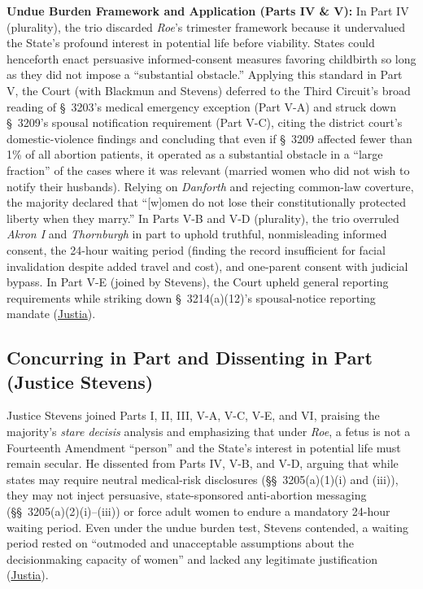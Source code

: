 \documentclass[12pt]{article}
\begin{document}
\textbf{Undue Burden Framework and Application (Parts IV \& V):} In Part IV (plurality), the trio discarded \textit{Roe}'s trimester framework because it undervalued the State's profound interest in potential life before viability. States could henceforth enact persuasive informed-consent measures favoring childbirth so long as they did not impose a ``substantial obstacle.'' Applying this standard in Part V, the Court (with Blackmun and Stevens) deferred to the Third Circuit's broad reading of \S\ 3203's medical emergency exception (Part V-A) and struck down \S\ 3209's spousal notification requirement (Part V-C), citing the district court's domestic-violence findings and concluding that even if \S\ 3209 affected fewer than 1\% of all abortion patients, it operated as a substantial obstacle in a ``large fraction'' of the cases where it was relevant (married women who did not wish to notify their husbands). Relying on \textit{Danforth} and rejecting common-law coverture, the majority declared that ``[w]omen do not lose their constitutionally protected liberty when they marry.'' In Parts V-B and V-D (plurality), the trio overruled \textit{Akron I} and \textit{Thornburgh} in part to uphold truthful, nonmisleading informed consent, the 24-hour waiting period (finding the record insufficient for facial invalidation despite added travel and cost), and one-parent consent with judicial bypass. In Part V-E (joined by Stevens), the Court upheld general reporting requirements while striking down \S\ 3214(a)(12)'s spousal-notice reporting mandate (\href{https://supreme.justia.com/cases/federal/us/505/833/}{Justia}).

\subsection{Concurring in Part and Dissenting in Part (Justice Stevens)}

Justice Stevens joined Parts I, II, III, V-A, V-C, V-E, and VI, praising the majority's \textit{stare decisis} analysis and emphasizing that under \textit{Roe}, a fetus is not a Fourteenth Amendment ``person'' and the State's interest in potential life must remain secular. He dissented from Parts IV, V-B, and V-D, arguing that while states may require neutral medical-risk disclosures (\S\S\ 3205(a)(1)(i) and (iii)), they may not inject persuasive, state-sponsored anti-abortion messaging (\S\S\ 3205(a)(2)(i)--(iii)) or force adult women to endure a mandatory 24-hour waiting period. Even under the undue burden test, Stevens contended, a waiting period rested on ``outmoded and unacceptable assumptions about the decisionmaking capacity of women'' and lacked any legitimate justification (\href{https://supreme.justia.com/cases/federal/us/505/833/}{Justia}).
\end{document}
